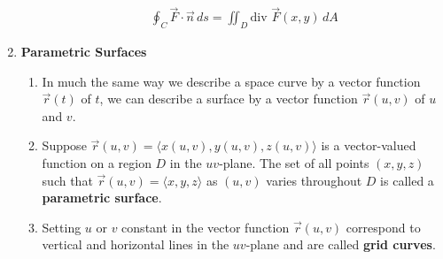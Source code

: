 \documentclass[10pt]{article}
\begin{document}
\begin{multicols*}{2}
\begin{enumerate}
\begin{enumerate}
\begin{align*}
            \oint_C \vec{F} \cdot \vec{n} \,ds = \iint_D \text{div }\vec{F}(x,y) \,dA
        \end{align*} 
    \end{enumerate}
    \item \textbf{Parametric Surfaces}
    \begin{enumerate}
        \item In much the same way we describe a space curve by a vector function $\vec{r}(t)$ of $t$, we can describe a surface by a vector function $\vec{r}(u,v)$ of $u$ and $v$.
        \item Suppose $\vec{r}(u,v) = \langle x(u,v), y(u,v), z(u,v) \rangle$ is a vector-valued function on a region $D$ in the $uv$-plane. The set of all points $(x,y,z)$ such that $\vec{r}(u,v) = \langle x,y,z \rangle$ as $(u,v)$ varies throughout $D$ is called a \textbf{parametric surface}.
        \item Setting $u$ or $v$ constant in the vector function $\vec{r}(u,v)$ correspond to vertical and horizontal lines in the $uv$-plane and are called \textbf{grid curves}.
        

\end{enumerate}
\end{enumerate}
\end{multicols*}
\end{document}

